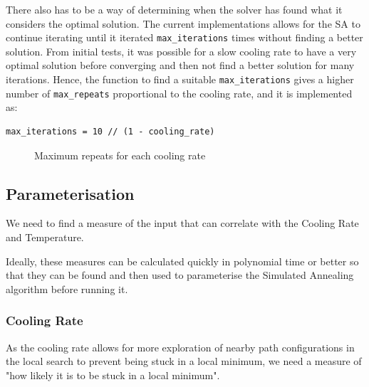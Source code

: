 \documentclass{article}
\begin{document}
There also has to be a way of determining when the solver has found what it considers the optimal solution.
The current implementations allows for the SA to continue iterating until it iterated \texttt{max\_iterations} times without finding a better solution.
From initial tests, it was possible for a slow cooling rate to have a very optimal solution before converging and then not find a better solution for many iterations.
Hence, the function to find a suitable \texttt{max\_iterations} gives a higher number of \texttt{max\_repeats} proportional to the cooling rate, and it is implemented as:

\begin{verbatim}
max_iterations = 10 // (1 - cooling_rate)
\end{verbatim}

\begin{figure}[H]
    \centering
    \caption{Maximum repeats for each cooling rate}
\end{figure}

\subsection{Parameterisation}

We need to find a measure of the input that can correlate with the Cooling Rate and Temperature.

Ideally, these measures can be calculated quickly in polynomial time or better so that they can be found and then used to parameterise the Simulated Annealing algorithm before running it.

\subsubsection{Cooling Rate}

As the cooling rate allows for more exploration of nearby path configurations in the local search to prevent being stuck in a local minimum, we need a measure of "how likely it is to be stuck in a local minimum".
\end{document}
